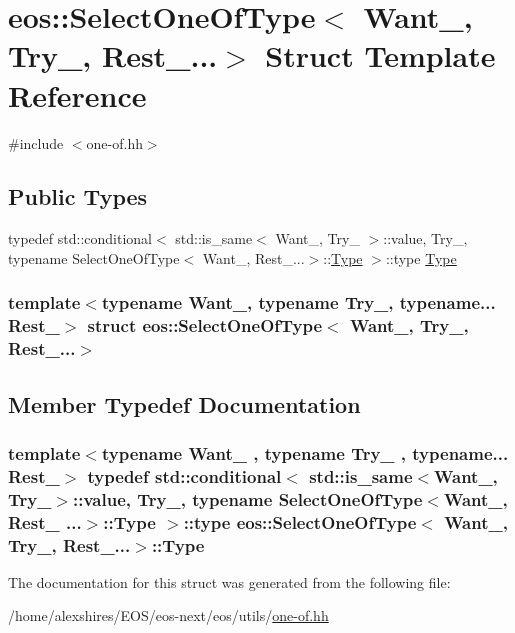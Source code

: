 \hypertarget{structeos_1_1SelectOneOfType_3_01Want___00_01Try___00_01Rest___8_8_8_4}{
\section{eos::SelectOneOfType$<$ Want\_\-, Try\_\-, Rest\_\-...$>$ Struct Template Reference}
\label{structeos_1_1SelectOneOfType_3_01Want___00_01Try___00_01Rest___8_8_8_4}
}


{\ttfamily \#include $<$one-\/of.hh$>$}\subsection*{Public Types}
\begin{DoxyCompactItemize}
\item 
typedef std::conditional$<$ std::is\_\-same$<$ Want\_\-, Try\_\- $>$::value, Try\_\-, typename SelectOneOfType$<$ Want\_\-, Rest\_\-...$>$::\hyperlink{structeos_1_1SelectOneOfType_3_01Want___00_01Try___00_01Rest___8_8_8_4_a740264f972731bf06d91d7ced803db0a}{Type} $>$::type \hyperlink{structeos_1_1SelectOneOfType_3_01Want___00_01Try___00_01Rest___8_8_8_4_a740264f972731bf06d91d7ced803db0a}{Type}
\end{DoxyCompactItemize}
\subsubsection*{template$<$typename Want\_\-, typename Try\_\-, typename... Rest\_\-$>$ struct eos::SelectOneOfType$<$ Want\_\-, Try\_\-, Rest\_\-...$>$}



\subsection{Member Typedef Documentation}
\hypertarget{structeos_1_1SelectOneOfType_3_01Want___00_01Try___00_01Rest___8_8_8_4_a740264f972731bf06d91d7ced803db0a}{
\subsubsection[{Type}]{\setlength{\rightskip}{0pt plus 5cm}template$<$typename Want\_\- , typename Try\_\- , typename... Rest\_\-$>$ typedef std::conditional$<$ std::is\_\-same$<$Want\_\-, Try\_\-$>$::value, Try\_\-, typename SelectOneOfType$<$Want\_\-, Rest\_\- ...$>$::{\bf Type} $>$::type eos::SelectOneOfType$<$ Want\_\-, Try\_\-, Rest\_\-...$>$::{\bf Type}}}
\label{structeos_1_1SelectOneOfType_3_01Want___00_01Try___00_01Rest___8_8_8_4_a740264f972731bf06d91d7ced803db0a}


The documentation for this struct was generated from the following file:\begin{DoxyCompactItemize}
\item 
/home/alexshires/EOS/eos-\/next/eos/utils/\hyperlink{one-of_8hh}{one-\/of.hh}\end{DoxyCompactItemize}
